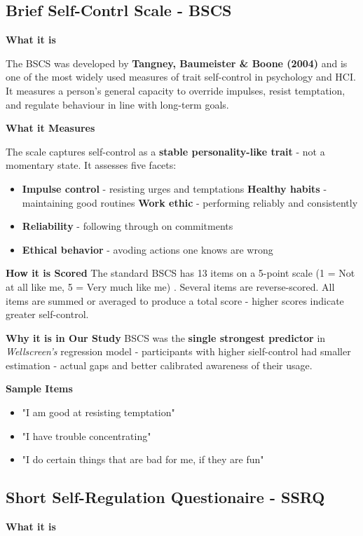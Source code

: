 \documentclass[12pt]{article}
\begin{document}
\subsection{Brief Self-Contrl Scale - BSCS}
\textbf{What it is}

The BSCS was developed by \textbf{Tangney, Baumeister \& Boone (2004)} and is one of the most widely used measures of trait self-control in psychology and HCI. It measures a person's general capacity to override impulses, resist temptation, and regulate behaviour in line with  long-term goals.

\textbf{What it Measures}

The scale captures self-control as a \textbf{stable personality-like trait} - not a momentary state. It assesses five facets:
\begin{itemize}
    \item \textbf{Impulse control} - resisting urges and temptations
    \textbf{Healthy habits} - maintaining  good routines
    \textbf{Work ethic} - performing reliably and consistently
    \item \textbf{Reliability} -  following through on commitments
    \item \textbf{Ethical behavior} - avoding actions one knows are wrong
\end{itemize}


\textbf{How it is Scored}
The standard BSCS has 13 items on a 5-point scale (1 = Not at all like me, 5 = Very much like me) . Several items are reverse-scored. All items are summed or averaged to produce a total score - higher scores indicate greater self-control.

\textbf{Why it is in Our Study}
BSCS was  the \textbf{single strongest predictor} in \textit{Wellscreen's} regression model - participants with higher sielf-control had smaller estimation - actual gaps and better calibrated awareness of their usage.

\textbf{Sample Items}
\begin{itemize}
    \item "I am good at resisting temptation"
    \item "I have trouble concentrating"
    \item "I do certain things that are bad for me, if they are fun"
\end{itemize}

\subsection{Short Self-Regulation Questionaire - SSRQ}
\textbf{What it is}
\end{document}
